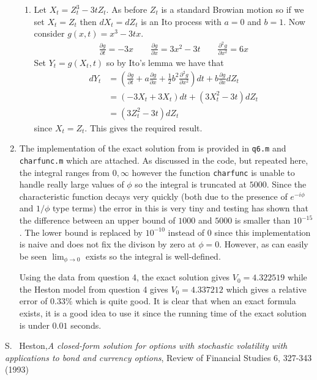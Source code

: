 \documentclass[10pt,english]{article}
\theoremstyle{plain}
\begin{document}
\begin{enumerate}
\begin{enumerate}
\item Let $X_{t}=Z_{t}^{3}-3tZ_{t}$. As before $Z_{t}$ is a standard Browian motion so if we set $X_{t}=Z_{t}$ then $dX_{t}=dZ_{t}$ is an Ito process with $a=0$ and $b=1$. Now consider $g(x,t)=x^{3}-3tx$. 
\begin{align*}
\frac{\partial g}{\partial t} = -3x \qquad \frac{\partial g}{\partial x}= 3x^{2}-3t \qquad \frac{\partial^{2}g}{\partial x^{2}}= 6x
\end{align*}
Set $Y_{t}=g(X_{t},t)$ so by Ito's lemma we have that
\begin{align*}
dY_{t} &= \left(\frac{\partial g}{\partial t} + a\frac{\partial g}{\partial x} + \frac{1}{2}b^{2}\frac{\partial^{2}g}{\partial x^{2}}\right)dt+b\frac{\partial g}{\partial x}dZ_{t}\\
&= (-3X_{t}+3X_{t})dt + (3X_{t}^{2}-3t)dZ_{t}\\
&= (3Z_{t}^{2}-3t)dZ_{t}
\end{align*}
since $X_{t}=Z_{t}$. This gives the required result.
\end{enumerate}

\item The implementation of the exact solution from \cite{heston} is provided in \texttt{q6.m} and \texttt{charfunc.m} which are attached. As discussed in the code, but repeated here, the integral ranges from $0,\infty$ however the function \texttt{charfunc} is unable to handle really large values of $\phi$ so the integral is truncated at $5000$. Since the characteristic function decays very quickly (both due to the presence of $e^{-i\phi}$ and $1/\phi$ type terms) the error in this is very tiny and testing has shown that the difference between an upper bound of $1000$ and $5000$ is smaller than $10^{-15}$. The lower bound is replaced by $10^{-10}$ instead of $0$ since this implementation is naive and does not fix the divison by zero at $\phi=0$. However, as can easily be seen $\lim_{\phi\rightarrow 0}$ exists so the integral is well-defined. 

Using the data from question 4, the exact solution gives $V_{0}=4.322519$ while the Heston model from question 4 gives $V_{0}=4.337212$ which gives a relative error of $0.33\%$ which is quite good. It is clear that when an exact formula exists, it is a good idea to use it since the running time of the exact solution is under $0.01$ seconds.
\end{enumerate}
\begin{thebibliography}{1}
 S. ~Heston,\textit{A closed-form solution for options with stochastic volatility with applications to bond and currency options}, Review of Financial Studies 6, 327-343 (1993)
\end{thebibliography}
\end{document}
